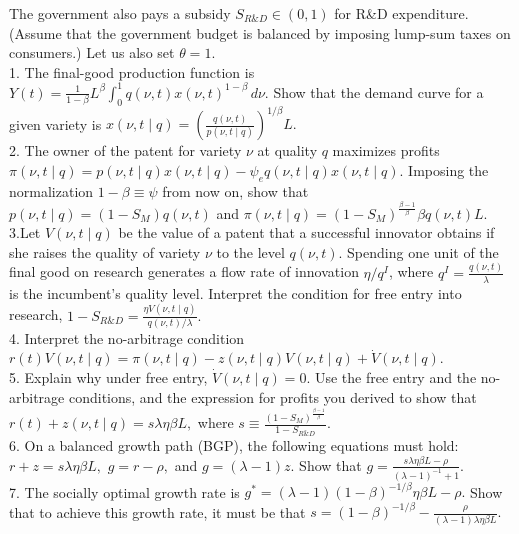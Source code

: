 \documentclass[11pt]{article}
\begin{document}
The government also pays a subsidy $S_{R\&D} \in (0,1)$ for R\&D expenditure. (Assume that the government budget is balanced by imposing lump-sum taxes on consumers.) Let us also set $\theta = 1$.\\

1. The final-good production function is $Y(t)=\frac{1}{1-\beta}L^\beta \int_0^1 q(\nu,t)x(\nu,t)^{1-\beta}\, d\nu .$ Show that the demand curve for a given variety is $x(\nu,t \mid q)=\left(\frac{q(\nu,t)}{p(\nu,t \mid q)}\right)^{1/\beta}L.$\\

2. The owner of the patent for variety $\nu$ at quality $q$ maximizes profits $\pi(\nu,t \mid q)=p(\nu,t \mid q)x(\nu,t \mid q)-\psi_e q(\nu,t \mid q)x(\nu,t \mid q).$ Imposing the normalization $1-\beta \equiv \psi$ from now on, show that $p(\nu,t \mid q)=(1-S_M)q(\nu,t)$ and $\pi(\nu,t \mid q)=(1-S_M)^{\frac{\beta-1}{\beta}}\beta q(\nu,t)L.$\\


3.Let $V(\nu,t \mid q)$ be the value of a patent that a successful innovator obtains if she raises the quality of variety $\nu$ to the level $q(\nu,t)$. Spending one unit of the final good on research generates a flow rate of innovation $\eta/q^I$, where $q^I=\frac{q(\nu,t)}{\lambda}$ is the incumbent's quality level. Interpret the condition for free entry into research, $1-S_{R\&D}=\frac{\eta V(\nu,t \mid q)}{q(\nu,t)/\lambda}.$\\

4. Interpret the no-arbitrage condition $r(t)V(\nu,t \mid q)=\pi(\nu,t \mid q)-z(\nu,t \mid q)V(\nu,t \mid q)+\dot V(\nu,t \mid q).$\\

5. Explain why under free entry, $\dot V(\nu,t \mid q)=0.$ Use the free entry and the no-arbitrage conditions, and the expression for profits you derived to show that $r(t)+z(\nu,t \mid q)=s\lambda\eta\beta L,$ where $s\equiv\frac{(1-S_M)^{\frac{\beta-1}{\beta}}}{1-S_{R\&D}}.$\\

6. On a balanced growth path (BGP), the following equations must hold: $r+z=s\lambda\eta\beta L,$ $g=r-\rho,$ and $g=(\lambda-1)z.$ Show that $g=\frac{s\lambda\eta\beta L-\rho}{(\lambda-1)^{-1}+1}.$\\

7. The socially optimal growth rate is $g^*=(\lambda-1)(1-\beta)^{-1/\beta}\eta\beta L-\rho.$ Show that to achieve this growth rate, it must be that $s=(1-\beta)^{-1/\beta}-\frac{\rho}{(\lambda-1)\lambda\eta\beta L}.$\\
\end{document}
